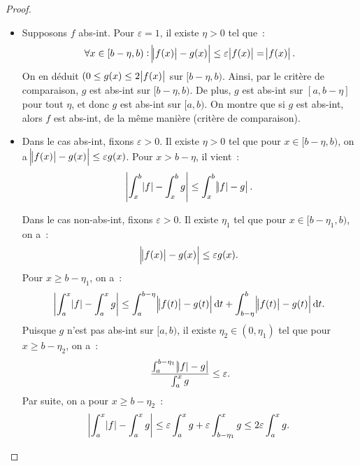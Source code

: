 \documentclass{report}
\theoremstyle{definition}
\theoremstyle{remark}
\numberwithin{equation}{section}
\begin{document}
			\begin{proof}~
			\begin{itemize}
				\item Supposons $f$ abs-int. Pour $\varepsilon = 1$, il existe $\eta > 0$ tel que~:
				\begin{equation}
					\forall x \in [b - \eta, b) : \abs {\abs {f(x)} - g(x)} \leq \varepsilon \abs {f(x)} = \abs {f(x)}.
				\end{equation}
				On en déduit $(0 \leq g(x) \leq 2\abs {f(x)}$ sur $[b-\eta, b)$. Ainsi, par le critère de comparaison, $g$ est abs-int sur $[b-\eta, b)$. De plus,
				$g$ est abs-int sur $[a, b-\eta]$ pour tout $\eta$, et donc $g$ est abs-int sur $[a, b)$. On montre que si $g$ est abs-int, alors $f$ est abs-int, de la
				même manière (critère de comparaison).
				\item Dans le cas abs-int, fixons $\varepsilon > 0$. Il existe $\eta > 0$ tel que pour $x \in [b-\eta, b)$, on a
				$\abs {\abs {f(x)}-g(x)} \leq \varepsilon g(x)$. Pour $x > b-\eta$, il vient~:
				\begin{equation}
					\abs {\int_x^b\abs f - \int_x^b g} \leq \int_x^b\abs {\abs f - g}.
				\end{equation}

				Dans le cas non-abs-int, fixons $\varepsilon > 0$. Il existe $\eta_1$ tel que pour $x \in [b-\eta_1, b)$, on a~:
				\begin{equation}
					\abs {\abs {f(x)} - g(x)} \leq \varepsilon g(x).
				\end{equation}
				Pour $x \geq b-\eta_1$, on a~:
				\begin{equation}
					\abs {\int_a^x \abs f - \int_a^x g} \leq \int_a^{b- \eta}\abs {\abs {f(t)} - g(t)}\dif t + \int_{b-\eta}^b\abs {\abs {f(t)} - g(t)}\dif t.
				\end{equation}
				Puisque $g$ n'est pas abs-int sur $[a, b)$, il existe $\eta_2 \in (0, \eta_1)$ tel que pour $x \geq b-\eta_2$, on a~:
				\begin{equation}
					\frac {\int_a^{b-\eta_1}\abs {\abs f - g}}{\int_a^x g} \leq \varepsilon.
				\end{equation}
				Par suite, on a pour $x \geq b - \eta_2$~:
				\begin{equation}
					\abs {\int_a^x \abs f - \int_a^x g} \leq \varepsilon \int_a^xg + \varepsilon\int_{b-\eta_1}^x g \leq 2\varepsilon \int_a^x g.
				\end{equation}
			\end{itemize}
			\end{proof}
\end{document}

